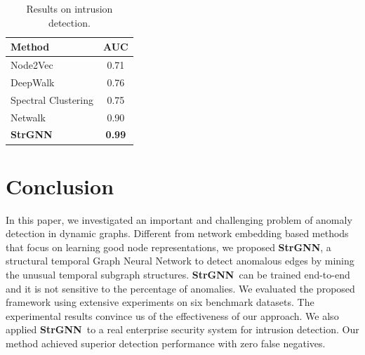 \documentclass{article}
\newcommand{\model}{\textbf{StrGNN}~}
\newcommand{\modele}{\textbf{StrGNN}}
\begin{document}

\begin{table}[t]
	\caption{Results on intrusion detection.}
	\label{tbl:asi}
	\centering
	\begin{tabular}{lc}
		\hline
		Method & AUC \\
		\hline
		\hline
		Node2Vec & 0.71  \\
		DeepWalk & 0.76   \\
		Spectral Clustering & 0.75  \\
		Netwalk & 0.90   \\
		\modele & \textbf{0.99}  \\
		\hline
	\end{tabular}
\end{table}


\section{Conclusion}
In this paper, we investigated an important and challenging problem of anomaly detection in dynamic graphs. Different from network embedding based methods that focus on learning good node representations, we proposed \modele, a structural temporal Graph Neural Network to detect anomalous edges by mining the unusual temporal subgraph structures. \model can be trained end-to-end and it is not sensitive to the percentage of anomalies. %
We evaluated the proposed framework using extensive experiments on six benchmark datasets. The experimental results convince us of the effectiveness of our approach. We also applied \model to a real enterprise security system for intrusion detection. Our method achieved superior detection performance with zero false negatives.






\end{document}
